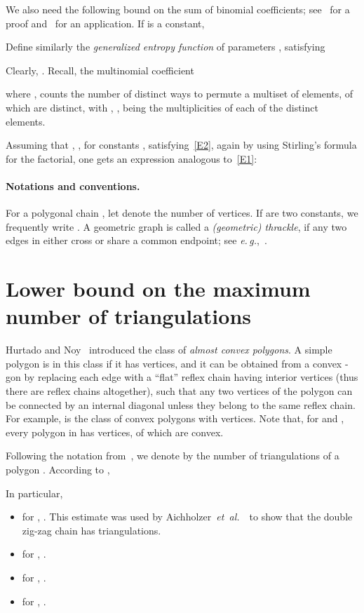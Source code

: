 \documentclass[11pt]{article}
\def\etal{{\it et~al.}\,}
\def\eg{{\it e.\,g.},~}
\begin{document}
We also need the following bound on the sum of binomial coefficients;
see~\cite{BST98} for a proof and~\cite{DK01,DS00} for an application.
If  is a constant,


Define similarly the {\em generalized entropy function} of 
parameters , satisfying





Clearly, . Recall, the multinomial coefficient

where , counts the number of distinct ways to
permute a multiset of  elements,  of which are distinct,
with , ,
being the multiplicities of each of the  distinct elements.

Assuming that , , for
constants , satisfying~\eqref{E2},
again by using Stirling's formula for the factorial, one gets
an expression analogous to~\eqref{E1}:



\paragraph{Notations and conventions.}
For a polygonal chain , let  denote the number of vertices.
If  are two constants, we frequently write
.
A geometric graph  is called a {\em (geometric) thrackle}, if any two
edges in  either cross or share a common endpoint; see \eg\cite{PA95}.


\section {Lower bound on the maximum number of triangulations}
\label{sec:tri}

Hurtado and Noy~\cite{HN97} introduced the class  of
{\em almost convex polygons}. A simple polygon is in this class
if it has  vertices, and it can be obtained from a convex -gon
by replacing each edge with a ``flat'' reflex chain having 
interior vertices (thus there are  reflex chains altogether), such
that any two vertices of the polygon can be connected by an internal
diagonal unless they belong to the same reflex chain.
For example,  is the class of convex polygons with  vertices.
Note that, for  and , every polygon in  has
 vertices,  of which are convex.

Following the notation from~\cite{HN97}, we denote by 
the number of triangulations of a polygon . According to
\cite[Theorem 3]{HN97},

In particular,
\begin{itemize}
\item for , .
This estimate was used by Aichholzer~\etal~\cite{AHV+06} to show that
the double zig-zag chain has  triangulations. 
\item for , .
\item for , .
\item for , .
\end{itemize}
\end{document}
